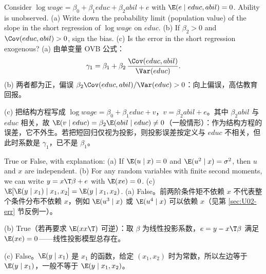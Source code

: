 \begin{prac}
Consider $\log wage=\beta_0+\beta_1educ+\beta_2abil+e$ with $\E(e\mid educ,abil)=0$. Ability is unobserved. (a) Write down the probability limit (population value) of the slope in the short regression of $\log wage$ on $educ$. (b) If $\beta_2>0$ and $\Cov(educ,abil)>0$, sign the bias. (c) Is the error in the short regression exogenous?
\answer
(a) 由单变量 OVB 公式：
\[
\gamma_1=\beta_1+\beta_2\,\frac{\Cov(educ,abil)}{\Var(educ)}.
\]
(b) 两者都为正，偏误 $\beta_2\Cov(educ,abil)/\Var(educ)>0$：向上偏误，高估教育回报。

(c) 把结构方程写成 $\log wage=\beta_0+\beta_1educ+v$，$v=\beta_2abil+e$。其中 $\beta_2abil$ 与 $educ$ 相关，故 $\E(v\mid educ)=\beta_2\E(abil\mid educ)\neq0$（一般情形）：作为结构方程的误差，它不外生。若把短回归仅视为投影，则投影误差按定义与 $educ$ 不相关，但此时系数是 $\gamma_1$，已不是 $\beta_1$。
\end{prac}

\begin{prac}
True or False, with explanation: (a) If $\E(u\mid x)=0$ and $\E(u^2\mid x)=\sigma^2$, then $u$ and $x$ are independent. (b) For any random variables with finite second moments, we can write $y=x\T\beta+e$ with $\E(xe)=0$. (c) $\E[\E(y\mid x_1)\mid x_1,x_2]=\E(y\mid x_1,x_2)$.
\answer
(a) False。前两阶条件矩不依赖 $x$ 不代表整个条件分布不依赖 $x$，例如 $\E(u^3\mid x)$ 或 $\E(u^4\mid x)$ 可以依赖 $x$（见第 \ref{sec:U02-err} 节反例一）。

(b) True（若再要求 $\E(xx\T)$ 可逆）：取 $\beta$ 为线性投影系数，$e=y-x\T\beta$ 满足 $\E(xe)=0$——线性投影模型总存在。

(c) False。$\E(y\mid x_1)$ 是 $x_1$ 的函数，给定 $(x_1,x_2)$ 时为常数，所以左边等于 $\E(y\mid x_1)$，一般不等于 $\E(y\mid x_1,x_2)$。
\end{prac}
